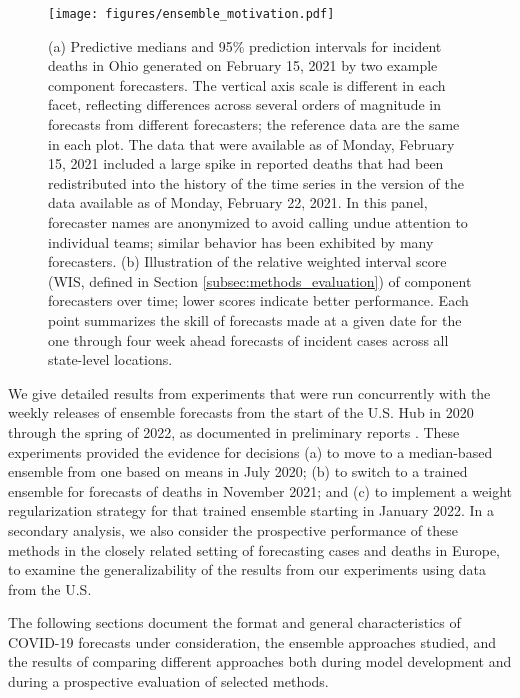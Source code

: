 \documentclass[11pt,3p,authoryear]{elsarticle}
\begin{document}
\begin{figure}
\centering
\texttt{[image: figures/ensemble\_motivation.pdf]}
\caption{(a) Predictive medians and 95\% prediction intervals for incident deaths in Ohio generated on February 15, 2021 by two example component forecasters. The vertical axis scale is different in each facet, reflecting differences across several orders of magnitude in forecasts from different forecasters; the reference data are the same in each plot. The data that were available as of Monday, February 15, 2021 included a large spike in reported deaths that had been redistributed into the history of the time series in the version of the data available as of Monday, February 22, 2021. In this panel, forecaster names are anonymized to avoid calling undue attention to individual teams; similar behavior has been exhibited by many forecasters. (b) Illustration of the relative weighted interval score (WIS, defined in Section \ref{subsec:methods_evaluation}) of component forecasters over time; lower scores indicate better performance. Each point summarizes the skill of forecasts made at a given date for the one through four week ahead forecasts of incident cases across all state-level locations. }
\label{fig:ensemble_motivations}
\end{figure}

We give detailed results from experiments that were run concurrently with the weekly releases of ensemble forecasts from the start of the U.S. Hub in 2020 through the spring of 2022, as documented in preliminary reports \citep{2020BrooksRay_covid_ensemble_blog, 2021RayBrooks_covid_ensemble_blog}.
These experiments provided the evidence for decisions (a) to move to a median-based ensemble from one based on means in July 2020; (b) to switch to a trained ensemble for forecasts of deaths in November 2021; and (c) to implement a weight regularization strategy for that trained ensemble starting in January 2022.
In a secondary analysis, we also consider the prospective performance of these methods in the closely related setting of forecasting cases and deaths in Europe, to examine the generalizability of the results from our experiments using data from the U.S.

The following sections document the format and general characteristics of COVID-19 forecasts under consideration, the ensemble approaches studied, and the results of comparing different approaches both during model development and during a prospective evaluation of selected methods.
\end{document}
